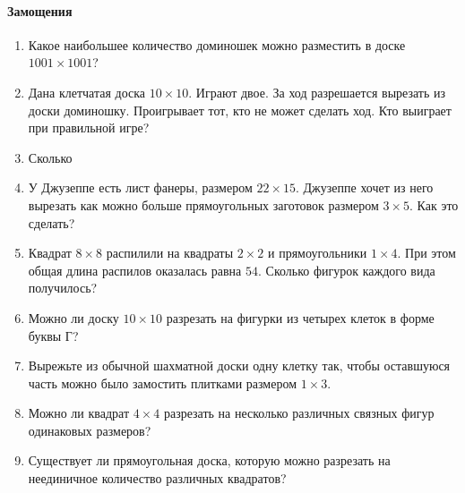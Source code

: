 \documentclass{article}
\begin{document}
	\centering \paragraph{Замощения}
		\begin{enumerate}
			\item Какое наибольшее количество доминошек можно разместить в доске $1001 \times 1001$?
			\item Дана клетчатая доска $10 \times 10$. Играют двое. За ход разрешается вырезать из доски доминошку. Проигрывает тот, кто не может сделать ход. Кто выиграет при правильной игре?
			\item Сколько
			\item У Джузеппе есть лист фанеры, размером $22 \times 15$. Джузеппе хочет из него вырезать как можно больше прямоугольных заготовок размером $3 \times 5$. Как это сделать?
			\item Квадрат $8 \times 8$ распилили на квадраты $2 \times 2$ и прямоугольники $1 \times 4$. При этом общая длина распилов оказалась равна $54$. Сколько фигурок каждого вида получилось?
			\item Можно ли доску $10 \times 10$ разрезать на фигурки из четырех клеток в форме буквы Г?
			\item Вырежьте из обычной шахматной доски одну клетку так, чтобы оставшуюся часть можно было замостить плитками размером $1 \times 3$. 
			\item Можно ли квадрат $4 \times 4$ разрезать на несколько различных связных фигур одинаковых размеров?
			\item Существует ли прямоугольная доска, которую можно разрезать на неединичное количество различных квадратов?
			
		\end{enumerate}
		
\end{document}
